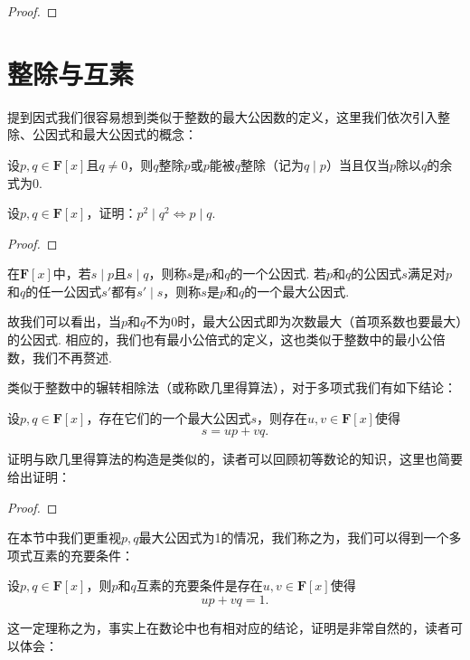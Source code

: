 \begin{proof}

\end{proof}

\section{整除与互素}

提到因式我们很容易想到类似于整数的最大公因数的定义，这里我们依次引入整除、公因式和最大公因式的概念：
\begin{definition}
    设$p,q\in\mathbf{F}[x]$且$q\neq 0$，则$q$整除$p$或$p$能被$q$整除（记为$q \mid p$）当且仅当$p$除以$q$的余式为0.
\end{definition}

\begin{example}
    设$p,q\in\mathbf{F}[x]$，证明：$p^2 \mid q^2\iff p \mid q$.
\end{example}

\begin{proof}

\end{proof}

\begin{definition}
    在$\mathbf{F}[x]$中，若$s \mid p$且$s \mid q$，则称$s$是$p$和$q$的一个公因式. 若$p$和$q$的公因式$s$满足对$p$和$q$的任一公因式$s'$都有$s' \mid s$，则称$s$是$p$和$q$的一个最大公因式.
\end{definition}
故我们可以看出，当$p$和$q$不为0时，最大公因式即为次数最大（首项系数也要最大）的公因式. 相应的，我们也有最小公倍式的定义，这也类似于整数中的最小公倍数，我们不再赘述.

类似于整数中的辗转相除法（或称欧几里得算法），对于多项式我们有如下结论：
\begin{theorem}\label{thm:17:欧几里得算法}
    设$p,q\in\mathbf{F}[x]$，存在它们的一个最大公因式$s$，则存在$u,v\in\mathbf{F}[x]$使得\[s=up+vq.\]
\end{theorem}
证明与欧几里得算法的构造是类似的，读者可以回顾初等数论的知识，这里也简要给出证明：

\begin{proof}

\end{proof}

在本节中我们更重视$p,q$最大公因式为1的情况，我们称之为，我们可以得到一个多项式互素的充要条件：
\begin{theorem}\label{thm:17:裴蜀定理}
    设$p,q\in\mathbf{F}[x]$，则$p$和$q$互素的充要条件是存在$u,v\in\mathbf{F}[x]$使得\[up+vq=1.\]
\end{theorem}
这一定理称之为，事实上在数论中也有相对应的结论，证明是非常自然的，读者可以体会：

